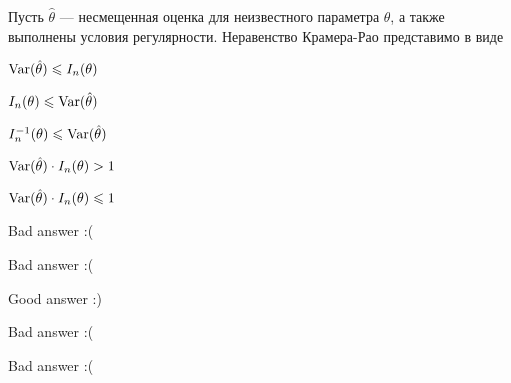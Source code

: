 
\begin{question}
Пусть \(\hat{\theta}\) --- несмещенная оценка для неизвестного параметра
\(\theta\), а также выполнены условия регулярности. Неравенство
Крамера-Рао представимо в виде
\begin{answerlist}
  \item \(\operatorname{Var}(\hat{\theta}) \leqslant I_n(\theta)\)
  \item \(I_n(\theta) \leqslant \operatorname{Var}(\hat{\theta})\)
  \item \(I_n^{-1}(\theta) \leqslant \operatorname{Var}(\hat{\theta})\)
  \item \(\operatorname{Var}(\hat{\theta}) \cdot I_n(\theta) > 1\)
  \item \(\operatorname{Var}(\hat{\theta}) \cdot I_n(\theta) \leqslant 1\)
\end{answerlist}
\end{question}

\begin{solution}
\begin{answerlist}
  \item Bad answer :(
  \item Bad answer :(
  \item Good answer :)
  \item Bad answer :(
  \item Bad answer :(
\end{answerlist}
\end{solution}


